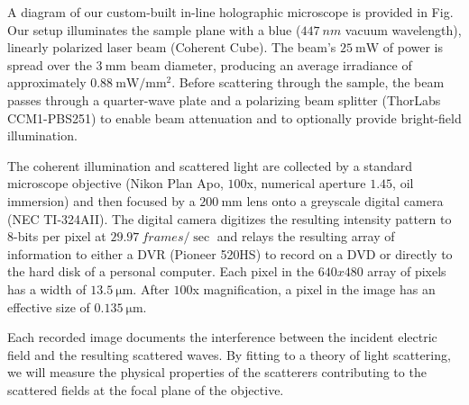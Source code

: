 A diagram of our custom-built in-line holographic microscope
is provided in Fig.~%
Our setup illuminates
the sample plane with a blue ($\SI{447}{nm}$ vacuum wavelength),
linearly polarized laser beam (Coherent Cube). The beam's
$\SI{25}{\mW}$ of power is spread over the $\SI{3}{\mm}$ beam
diameter, producing an average irradiance of approximately
$\SI{0.88}{\mW / \mm^2}$. Before scattering through the
sample, the beam passes through a quarter-wave plate and a
polarizing beam splitter (ThorLabs CCM1-PBS251) to enable
beam attenuation and to optionally provide bright-field
illumination.

The coherent illumination and scattered light are collected by a
standard microscope objective (Nikon Plan Apo, $\num{100}$x,
numerical aperture $\num{1.45}$, oil immersion) and then focused
by a $\SI{200}{\mm}$ lens onto a greyscale digital camera
(NEC TI-324AII). The digital camera digitizes the resulting intensity
pattern to $8$-bits per pixel at $\SI{29.97}{frames / \sec}$ and relays the
resulting array of information to either a DVR (Pioneer 520HS) to record
on a DVD or directly to the hard disk of a personal computer.
Each pixel in the $\si{640 x 480}$ array of pixels has a width of
$\SI{13.5}{\um}$. After $100$x magnification, a pixel in the
image has an effective size of $\SI{0.135}{\um}$.

Each recorded image documents the interference between the incident
electric field and the resulting scattered waves. By fitting
to a theory of light scattering, we will measure the physical
properties of the scatterers contributing to the scattered fields
at the focal plane of the objective.





